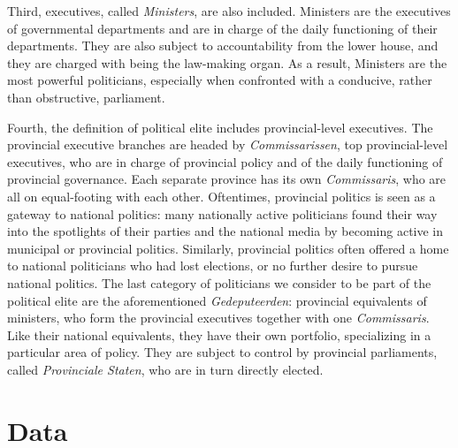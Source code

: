    Third, executives, called \textit{Ministers}, are also included. Ministers are the executives of governmental departments and are in charge of the daily functioning of their departments. They are also subject to accountability from the lower house, and they are charged with being the law-making organ. \autocite{secker1991ministers} As a result, Ministers are the most powerful politicians, especially when confronted with a conducive, rather than obstructive, parliament. \autocite[16]{bosmans2011parlementaire}

    Fourth, the definition of political elite includes provincial-level executives. The provincial executive branches are headed by \textit{Commissarissen}, top provincial-level executives, who are in charge of provincial policy and of the daily functioning of provincial governance. Each separate province has its own \textit{Commissaris}, who are all on equal-footing with each other. Oftentimes, provincial politics is seen as a gateway to national politics: many nationally active politicians found their way into the spotlights of their parties and the national media by becoming active in municipal or provincial politics. Similarly, provincial politics often offered a home to national politicians who had lost elections, or no further desire to pursue national politics. The last category of politicians we consider to be part of the political elite are the aforementioned \textit{Gedeputeerden}: provincial equivalents of ministers, who form the provincial executives together with one \textit{Commissaris}. Like their national equivalents, they have their own portfolio, specializing in a particular area of policy. They are subject to control by provincial parliaments, called \textit{Provinciale Staten}, who are in turn directly elected. \autocite{blok1987stemmen}

\section{Data}
